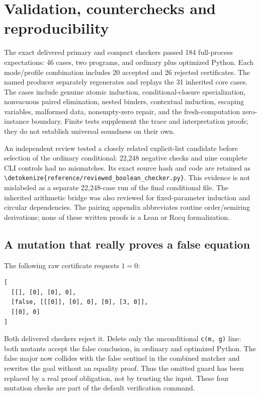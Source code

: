 \documentclass[11pt,letterpaper]{article}
\theoremstyle{definition}\newtheorem{definition}[theorem]{Definition}
\theoremstyle{remark}\newtheorem{remark}[theorem]{Remark}
\newcommand{\file}[1]{\expandafter\nolinkurl\expandafter{\detokenize{#1}}}
\begin{document}



\section{Validation, counterchecks and reproducibility}
\label{sec:validation}

The exact delivered primary and compact checkers passed 184 full-process
expectations: 46 cases, two programs, and ordinary plus optimized Python.
Each mode/profile combination includes 20 accepted and 26 rejected
certificates. The named producer separately regenerates and replays the
31 inherited core cases. The cases include genuine atomic induction,
conditional-closure specialization, nonvacuous paired elimination,
nested binders, contextual induction, escaping variables, malformed
data, nonempty-zero repair, and the fresh-computation zero-instance
boundary. Finite tests supplement the trace and interpretation proofs;
they do not establish universal soundness on their own.

An independent review tested a closely related explicit-list candidate
before selection of the ordinary conditional: 22,248 negative checks
and nine complete CLI controls had no mismatches. Its exact source hash
and code are retained as \file{reference/reviewed_boolean_checker.py}.
This evidence is not mislabeled as a separate 22,248-case run of the
final conditional file. The inherited arithmetic bridge was also
reviewed for fixed-parameter induction and circular dependencies.
The pairing appendix abbreviates routine order/semiring derivations;
none of these written proofs is a Lean or Rocq formalization.

\subsection{A mutation that really proves a false equation}

The following raw certificate requests \(1=0\):
\begin{lstlisting}
[
  [[], [0], [0], 0],
  [false, [[[0]], [0], 0], [0], [3, 0]],
  [[0], 0]
]
\end{lstlisting}
Both delivered checkers reject it. Delete only the unconditional
\texttt{c(m, g)} line: both mutants accept the false conclusion, in
ordinary and optimized Python. The false major now collides with the
false sentinel in the combined matcher and rewrites the goal without
an equality proof. Thus the omitted guard has been replaced by a real
proof obligation, not by trusting the input. These four mutation checks
are part of the default verification command.
\end{document}
